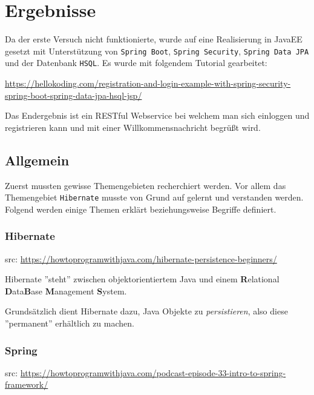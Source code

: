 
\section{Ergebnisse}
Da der erste Versuch nicht funktionierte, wurde auf eine Realisierung in JavaEE gesetzt mit Unterstützung von \verb|Spring Boot|, \verb|Spring Security|, \verb|Spring Data JPA| und der Datenbank \verb|HSQL|. Es wurde mit folgendem Tutorial gearbeitet:

\href{https://hellokoding.com/registration-and-login-example-with-spring-security-spring-boot-spring-data-jpa-hsql-jsp/}{https://hellokoding.com/registration-and-login-example-with-spring-security-spring-boot-spring-data-jpa-hsql-jsp/}

Das Endergebnis ist ein RESTful Webservice bei welchem man sich einloggen und registrieren kann und mit einer Willkommensnachricht begrüßt wird. 

\subsection{Allgemein}
Zuerst mussten gewisse Themengebieten recherchiert werden. Vor allem das Themengebiet \verb|Hibernate| musste von Grund auf gelernt und verstanden werden. Folgend werden einige Themen erklärt beziehungsweise Begriffe definiert. 

\subsubsection{Hibernate}

src: \href{https://howtoprogramwithjava.com/hibernate-persistence-beginners/}{https://howtoprogramwithjava.com/hibernate-persistence-beginners/}


Hibernate ''steht'' zwischen objektorientiertem Java und einem \textbf{R}elational \textbf{D}ata\textbf{B}ase \textbf{M}anagement \textbf{S}ystem.

Grundsätzlich dient Hibernate dazu, Java Objekte zu \textit{persistieren}, also diese ''permanent'' erhältlich zu machen.

\subsubsection{Spring} 

src: \href{https://howtoprogramwithjava.com/podcast-episode-33-intro-to-spring-framework/}{https://howtoprogramwithjava.com/podcast-episode-33-intro-to-spring-framework/}


